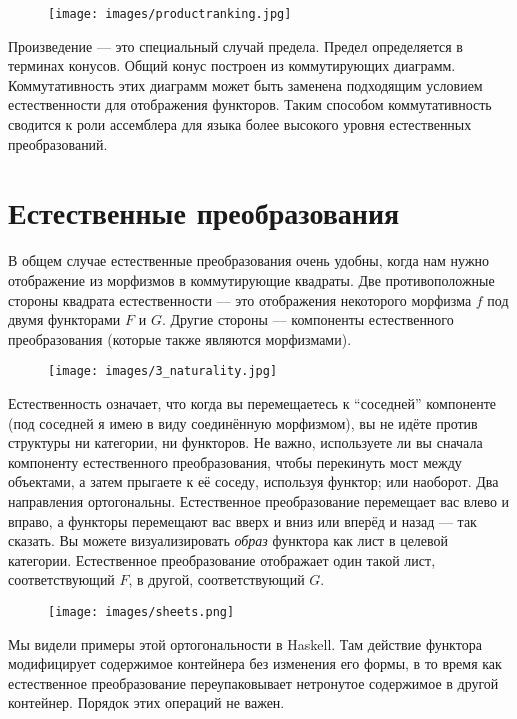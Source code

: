 \begin{figure}[H]
  \centering
  \texttt{[image: images/productranking.jpg]}
\end{figure}

\noindent
Произведение --- это специальный случай предела. Предел определяется в терминах
конусов. Общий конус построен из коммутирующих диаграмм. Коммутативность
этих диаграмм может быть заменена подходящим условием естественности для
отображения функторов. Таким способом коммутативность сводится к роли
ассемблера для языка более высокого уровня естественных
преобразований.

\section{Естественные преобразования}

В общем случае естественные преобразования очень удобны, когда нам нужно
отображение из морфизмов в коммутирующие квадраты. Две противоположные стороны
квадрата естественности --- это отображения некоторого морфизма $f$ под двумя
функторами $F$ и $G$. Другие стороны --- компоненты
естественного преобразования (которые также являются морфизмами).

\begin{figure}[H]
  \centering
  \texttt{[image: images/3\_naturality.jpg]}
\end{figure}

\noindent
Естественность означает, что когда вы перемещаетесь к ``соседней'' компоненте (под
соседней я имею в виду соединённую морфизмом), вы не идёте против
структуры ни категории, ни функторов. Не важно,
используете ли вы сначала компоненту естественного преобразования, чтобы
перекинуть мост между объектами, а затем прыгаете к её соседу, используя
функтор; или наоборот. Два направления ортогональны.
Естественное преобразование перемещает вас влево и вправо, а функторы перемещают
вас вверх и вниз или вперёд и назад --- так сказать. Вы можете визуализировать
\emph{образ} функтора как лист в целевой категории. Естественное
преобразование отображает один такой лист, соответствующий $F$, в другой,
соответствующий $G$.

\begin{figure}[H]
  \centering
  \texttt{[image: images/sheets.png]}
\end{figure}

\noindent
Мы видели примеры этой ортогональности в Haskell. Там действие
функтора модифицирует содержимое контейнера без изменения его
формы, в то время как естественное преобразование переупаковывает нетронутое содержимое
в другой контейнер. Порядок этих операций не
важен.

